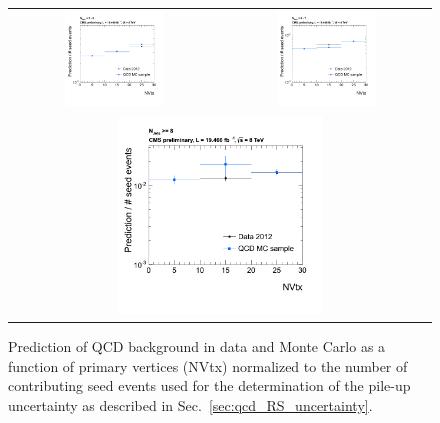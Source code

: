 \begin{figure}[hbtp]
  \centering
  \begin{tabular}{cc}
                \includegraphics[width=0.5\textwidth]{figures/PUUncertainty_NJet3_5.png} &
                \includegraphics[width=0.5\textwidth]{figures/PUUncertainty_NJet6_7.png} \\
                \multicolumn{2}{c}{\includegraphics[width=0.5\textwidth]{figures/PUUncertainty_NJet8.png}}
  \end{tabular}
  \caption{Prediction of QCD background in data and Monte Carlo as a function of primary vertices (NVtx) normalized to the number of contributing seed events used for the determination of the pile-up uncertainty as described in Sec.~\ref{sec:qcd_RS_uncertainty}.}
  \label{fig:qcd_rs_pileup}
\end{figure}

